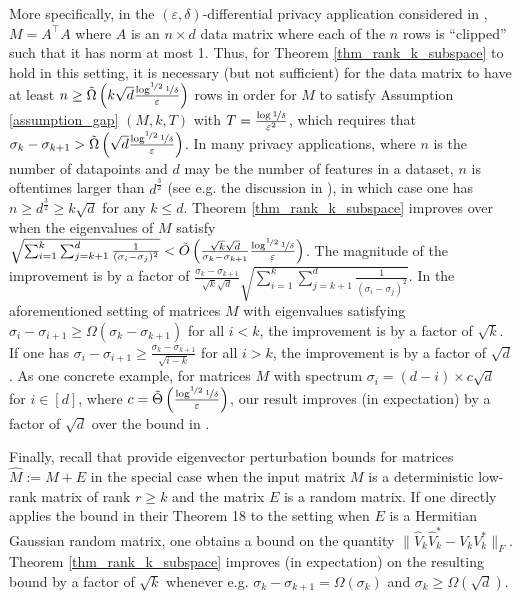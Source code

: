 \documentclass[11pt,letterpaper]{article}
\renewcommand{\epsilon}{\varepsilon}
\begin{document}
More specifically, in the $(\epsilon, \delta)$-differential privacy application considered in \cite{dwork2014analyze}, \(M = A^\top A\) where \(A\) is an \(n \times d\) data matrix where each of the \(n\) rows is “clipped” such that it has norm at most 1. Thus, for Theorem \ref{thm_rank_k_subspace} to hold in this setting, it is necessary (but not sufficient) for the data matrix to have at least \(n \geq \tilde{\Omega}\left(k \sqrt{d} \frac{\log^{\nicefrac{1}{2}} \nicefrac{1}{\delta}}{\epsilon}\right) \) rows in order for \(M\) to satisfy Assumption \ref{assumption_gap} $(M, k, T)$ with $T = \frac{\log \nicefrac{1}{\delta}}{\epsilon^2}$, which requires that \(\sigma_k - \sigma_{k+1} > \tilde{\Omega}\left(\sqrt{d} \frac{\log^{\nicefrac{1}{2}} \nicefrac{1}{\delta}}{\epsilon}\right)\).
    In many privacy applications, where $n$ is the number of datapoints and $d$ may be the number of features in a dataset, $n$ is oftentimes larger than $d^{\frac{3}{2}}$ (see e.g. the discussion in \cite{brown2021covariance}),
    in which case one has $n \geq d^{\frac{3}{2}}\geq k \sqrt{d}$ for any $k \leq d$. 
%
Theorem \ref{thm_rank_k_subspace} improves over \cite{dwork2014analyze} when the eigenvalues of \(M\) satisfy \(\sqrt{\sum_{i=1}^k \sum_{j= k+1}^d  \frac{1}{(\sigma_i - \sigma_j)^2}} < \tilde{O}\left(\frac{\sqrt{k}\sqrt{d}}{\sigma_k - \sigma_{k+1}}  \frac{\log^{\nicefrac{1}{2}} \nicefrac{1}{\delta}}{\epsilon}\right)\).
     The magnitude of the improvement is by a factor of \(\frac{\sigma_k - \sigma_{k+1}}{\sqrt{k}\sqrt{d}} \sqrt{\sum_{i=1}^k \sum_{j= k+1}^d  \frac{1}{(\sigma_i - \sigma_j)^2}}\). 
     In the aforementioned setting of  matrices \(M\) with eigenvalues satisfying \(\sigma_i - \sigma_{i+1} \geq \Omega(\sigma_k- \sigma_{k+1})\) for all \(i<k\), the improvement is by a factor of \(\sqrt{k}\). 
    If one has \(\sigma_i - \sigma_{i+1} \geq \frac{\sigma_k - \sigma_{k+1}}{\sqrt{i-k}}\) for all \(i > k\), the improvement is by a factor of \(\sqrt{d}\).
      As one concrete example, for matrices $M$ with spectrum $\sigma_i = (d - i) \times c \sqrt{d}$ for $i \in [d]$, where $c = \tilde{\Theta}\left(\frac{\log^{\nicefrac{1}{2}} \nicefrac{1}{\delta}}{\epsilon}\right)$, our result improves (in expectation) by a factor of $\sqrt{d}$ over the bound in  \cite{dwork2014analyze}.
\color{black}

 Finally, recall that \cite{o2018random} provide eigenvector perturbation bounds for matrices $\hat{M} := M+E$ in the special case when the input matrix $M$ is a deterministic low-rank matrix of rank $r \geq k$ and the matrix $E$ is a random matrix.
 If one directly applies the bound in their Theorem 18 to the setting when $E$ is a Hermitian Gaussian random matrix, one obtains a bound on the quantity $\|\hat{V}_k \hat{V}_k^\ast - V_k V_k^\ast\|_F$.
%
Theorem \ref{thm_rank_k_subspace} improves (in expectation) on the resulting bound by a factor of $\sqrt{k}$ whenever e.g. $\sigma_{k}-\sigma_{k+1} = \Omega(\sigma_k)$ and $\sigma_k \geq \Omega(\sqrt{d})$.
\end{document}
